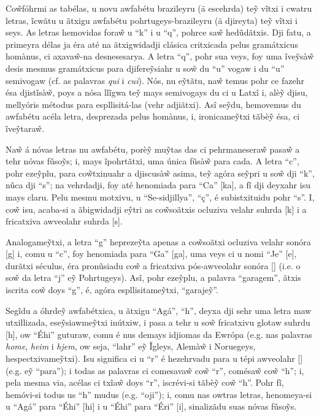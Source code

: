 \documentclass[12pt, a5paper, titlepage]{article}
\begin{document}
\begin{bilingualpages}
    Co\~wfóhrmi as tabélas, u novu awfabétu brazileyru (ä escehrda) te\~y vĩtxi i
    cwatru letras, ĩcwãtu u ãtxigu awfabétu pohrtugeys-brazileyru (ä djireyta)
    te\~y vĩtxi i seys. As letras hemovidas fora\~w u ``k'' i u ``q'', pohrce sa\~w
    hedũdãtxis. Dji fatu, a primeyra délas ja éra até na ãtxigwidadji clásica
    critxicada pelus gramátxicus homànus, ci axava\~w-na desnesesarya. A letra
    ``q'', pohr sua veys, foy uma ĩve\~ysà\~w desis mesmus gramátxicus para
    djifere\~ysiahr u so\~w du ``u'' vogaw i du ``u'' semivogaw (cf. as palavras
    \textit{qui} i \textit{cui}). Nós, nu e\~ytãtu, na\~w temus pohr ce fazehr ésa
    djistĩsà\~w, poys a nósa llĩgwa te\~y mays semivogays du ci u Latxî i, alè\~y djisu, mellyóris métodus para espllisitá-las (vehr adjiãtxi). Asî se\~ydu,
    hemovemus du awfabétu acéla letra, desprezada pelus homànus, i, ironicame\~ytxi tãbè\~y ésa, ci ĩve\~ytara\~w.

    Na\~w á nóvas letras nu awfabétu, porè\~y mu\~ytas das ci pehrmanesera\~w
    pasa\~w a tehr nóvas fũso\~ys; i, mays ĩpohrtãtxi, uma única fũsà\~w para cada.
    A letra ``c'', pohr eze\~yplu, para co\~wtxinuahr a djiscusà\~w asima, te\~y
    agóra se\~ypri u so\~w dji ``k'', nũca dji ``s''; na vehrdadji, foy até
    henomiada para ``Ca'' [ka], a fĩ dji deyxahr isu mays claru. Pelu mesmu
    motxivu, u ``Se-sidjillya'', ``ç'', é subistxituidu pohr ``s''. I, co\~w isu,
    acaba-si a ãbigwidadji e\~ytri as co\~wsoãtxis ocluziva velahr suhrda [k] i a
    fricatxiva awveolahr suhrda [s].

    Analogame\~ytxi, a letra ``g'' hepreze\~yta apenas a co\~wsoãtxi ocluziva
    velahr sonóra [g] i, comu u ``c'', foy henomiada para ``Ga'' [ga], uma veys ci
    u nomi ``Je'' [\textyogh e], durãtxi séculus, éra pronũsiadu co\~w a fricatxiva
    pós-awveolahr sonóra [\textyogh] (i.e. o so\~w da letra ``j'' e\~y Pohrtugeys).
    Asî, pohr eze\~yplu, a palavra ``garagem'', ãtxis iscrita co\~w doys ``g'', é,
    agóra espllisitame\~ytxi, ``garaje\~y''.

    Segĩdu a óhrde\~y awfabétxica, u ãtxigu ``Agá'', ``h'', deyxa dji sehr uma
    letra maw utxillizada, ese\~ysiawme\~ytxi inútxiw, i pasa a tehr u so\~w
    fricatxivu glotaw suhrdu [h], ow ``Éhi'' guturaw, comu é nus demays idjiomas da
    Ewrópa (e.g. nas palavras \textit{home}, \textit{heim} i \textit{hjem}, ow
    seja, ``lahr'' e\~y Ĩgleys, Alemà\~w i Noruegeys, hespectxivame\~ytxi). Isu
    significa ci u ``r'' é hezehrvadu para u tépi awveolahr [\textfishhookr] (e.g.
    e\~y ``para''); i todas as palavras ci comesava\~w co\~w ``r'', comésa\~w co\~w
    ``h''; i, pela mesma via, acélas ci txĩa\~w doys ``r'', iscrévi-si tãbè\~y
    co\~w ``h''. Pohr fĩ, hemóvi-si todus us ``h'' mudus (e.g. ``oji''); i, comu
    nas owtras letras, henomeya-si u ``Agá'' para ``Éhi'' [\textepsilon hi] i u
    ``Éhi'' para ``Éri'' [\textepsilon \textfishhookr i], sinalizãdu suas nóvas
    fũso\~ys.


\end{bilingualpages}
\end{document}
